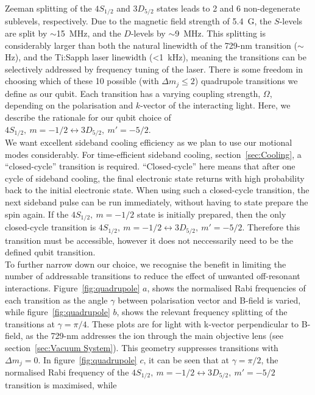     Zeeman splitting of the $4S_{1/2}$ and $3D_{5/2}$ states leads to 2 and 6
    non-degenerate sublevels, respectively. Due to the magnetic field strength of 5.4~G,
    the $S$-levels are split by $\sim$15~MHz, and the $D$-levels by $\sim$9~MHz.
    This splitting is considerably larger than both the natural linewidth of the
    729-nm transition ($\sim$Hz), and the Ti:Sapph laser linewidth (<1~kHz), meaning the transitions can be 
    selectively addressed by frequency tuning of the laser. There is some freedom in choosing which of these 10 possible (with $\Delta m_j \leq 2$) quadrupole transitions we define as our qubit. Each transition has a varying coupling strength, $\Omega$, depending on the polarisation and $k$-vector of the interacting light. Here, we describe the rationale for our qubit choice of $4S_{1/2},~m = -1/2 \leftrightarrow 3D_{5/2}, ~m' = -5/2$.\\
    We want excellent sideband cooling efficiency as we plan to use our motional modes considerably. For time-efficient sideband cooling, section~\ref{sec:Cooling}, a ``closed-cycle'' transition is required. ``Closed-cycle'' here means that after one cycle of sideband cooling, the final electronic state returns with high probability back to the initial electronic state. When using such a closed-cycle transition, the next sideband pulse can be run immediately, without having to state prepare the spin again. If the $4S_{1/2},~m = -1/2$ state is initially prepared, then the only closed-cycle transition is $4S_{1/2},~m = -1/2 \leftrightarrow 3D_{5/2},~m' = -5/2$. Therefore this transition must be accessible, however it does not neccessarily need to be the defined qubit transition. \\
    To further narrow down our choice, we recognise the benefit in limiting the number of addressable transitions to reduce the effect of unwanted off-resonant interactions. Figure~\ref{fig:quadrupole} $a$, shows the normalised Rabi frequencies of each transition as the angle $\gamma$ between polarisation vector and B-field is varied, while figure~\ref{fig:quadrupole} $b$, shows the relevant frequency splitting of the transitions at $\gamma = \pi/4$. These plots are for light with k-vector perpendicular to B-field, as the 729-nm addresses the ion through the main objective lens (see section~\ref{sec:Vacuum System}). This geometry suppresses transitions with $\Delta m_j = 0$. In figure~\ref{fig:quadrupole} $c$, it can be seen that at $\gamma = \pi/2$, the normalised Rabi frequency of the
    $4S_{1/2},~m = -1/2 \leftrightarrow 3D_{5/2},~m' = -5/2$ transition is maximised, while
